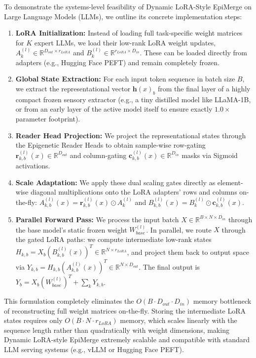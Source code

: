 To demonstrate the systems-level feasibility of Dynamic LoRA-Style EpiMerge on Large Language Models (LLMs), we outline its concrete implementation steps:
\begin{enumerate}
    \item \textbf{LoRA Initialization:} Instead of loading full task-specific weight matrices for $K$ expert LLMs, we load their low-rank LoRA weight updates, $A_k^{(l)} \in \mathbb{R}^{D_{out} \times r_{LoRA}}$ and $B_k^{(l)} \in \mathbb{R}^{r_{LoRA} \times D_{in}}$. These can be loaded directly from adapters (e.g., Hugging Face PEFT) and remain completely frozen.
    \item \textbf{Global State Extraction:} For each input token sequence in batch size $B$, we extract the representational vector $\mathbf{h}(x)_b$ from the final layer of a highly compact frozen sensory extractor (e.g., a tiny distilled model like LLaMA-1B, or from an early layer of the active model itself to ensure exactly $1.0\times$ parameter footprint).
    \item \textbf{Reader Head Projection:} We project the representational states through the Epigenetic Reader Heads to obtain sample-wise row-gating $\mathbf{r}_{k, b}^{(l)}(x) \in \mathbb{R}^{D_{out}}$ and column-gating $\mathbf{c}_{k, b}^{(l)}(x) \in \mathbb{R}^{D_{in}}$ masks via Sigmoid activations.
    \item \textbf{Scale Adaptation:} We apply these dual scaling gates directly as element-wise diagonal multiplications onto the LoRA adapters' rows and columns on-the-fly: $A_{k, b}^{(l)}(x) = \mathbf{r}_{k, b}^{(l)}(x) \odot A_k^{(l)}$ and $B_{k, b}^{(l)}(x) = B_k^{(l)} \odot \mathbf{c}_{k, b}^{(l)}(x)$.
    \item \textbf{Parallel Forward Pass:} We process the input batch $X \in \mathbb{R}^{B \times N \times D_{in}}$ through the base model's static frozen weight $W_{base}^{(l)}$. In parallel, we route $X$ through the gated LoRA paths: we compute intermediate low-rank states $H_{k, b} = X_b \left( B_{k, b}^{(l)}(x) \right)^T \in \mathbb{R}^{N \times r_{LoRA}}$, and project them back to output space via $Y_{k, b} = H_{k, b} \left( A_{k, b}^{(l)}(x) \right)^T \in \mathbb{R}^{N \times D_{out}}$. The final output is $Y_b = X_b \left( W_{base}^{(l)} \right)^T + \sum_k Y_{k, b}$.
\end{enumerate}
This formulation completely eliminates the $O(B \cdot D_{out} \cdot D_{in})$ memory bottleneck of reconstructing full weight matrices on-the-fly. Storing the intermediate LoRA states requires only $O(B \cdot N \cdot r_{LoRA})$ memory, which scales linearly with the sequence length rather than quadratically with weight dimensions, making Dynamic LoRA-style EpiMerge extremely scalable and compatible with standard LLM serving systems (e.g., vLLM or Hugging Face PEFT).

